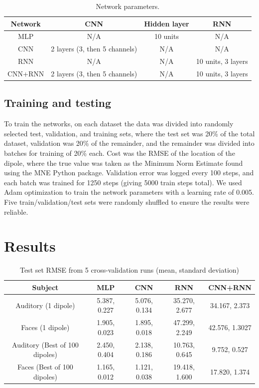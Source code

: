 \documentclass[journal]{IEEEtran}
\begin{document}
\begin{table}[h!]
  \centering
  \begin{tabular}{c||c|c|c}
    \hline
    Network & CNN & Hidden layer & RNN\\
    \hline
    \hline
    MLP & N/A & 10 units & N/A \\
    \hline
    CNN & 2 layers (3, then 5 channels) & N/A & N/A \\
    \hline
    RNN & N/A & N/A & 10 units, 3 layers \\
    \hline
    CNN+RNN & 2 layers (3, then 5 channels) &  N/A & 10 units, 3 layers \\
  \end{tabular}
  \caption{Network parameters.}
  \label{tab:params}
\end{table}


\subsection{Training and testing}

To train the networks, on each dataset the data was divided into randomly selected test, validation, and training sets, where the test set was 20\% of the total dataset, validation was 20\% of the remainder, and the remainder was divided into batches for training of 20\% each. Cost was the RMSE of the location of the dipole, where the true value was taken as the Minimum Norm Estimate found using the MNE Python package. Validation error was logged every 100 steps, and each batch was trained for 1250 steps (giving 5000 train steps total). We used Adam optimization to train the network parameters \cite{kingma2014adam} with a learning rate of 0.005. Five train/validation/test sets were randomly shuffled to ensure the results were reliable.

\section{Results}


\begin{table}[h!]
  \centering
  \begin{tabular}{c||c|c|c|c}
    \hline
    Subject & MLP & CNN & RNN & CNN+RNN\\
    \hline
    \hline
    Auditory (1 dipole) & 5.387, 0.227 & 5.076, 0.134 & 35.270, 2.677 & 34.167, 2.373 \\
    \hline
    Faces (1 dipole) &  1.905, 0.023 & 1.895, 0.018 & 47.299, 2.249 & 42.576, 1.3027 \\
    \hline
    Auditory (Best of 100 dipoles) & 2.450, 0.404 & 2.138, 0.186 & 10.763, 0.645 & 9.752, 0.527 \\
    \hline
    Faces (Best of 100 dipoles) &  1.165, 0.012 & 1.121, 0.038 & 19.418, 1.600 & 17.820, 1.374 \\
    \hline
  \end{tabular}
  \caption{Test set RMSE from 5 cross-validation runs (mean, standard deviation)}
  \label{tab:results}
\end{table}
\end{document}
